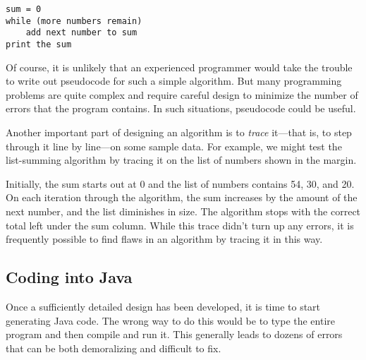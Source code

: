 \begin{jjjlisting}
\begin{lstlisting}
sum = 0
while (more numbers remain)
    add next number to sum
print the sum
\end{lstlisting}
\end{jjjlisting}

Of course, it is unlikely that an experienced programmer would take
the trouble to write out pseudocode for such a simple algorithm.  But
many programming problems are quite complex and require careful design
to minimize the number of errors that the program contains.  In such
situations, pseudocode could be useful.

Another important part of designing an algorithm is to {\it trace}
it---that is, to step through it line by line---on some sample data.
For example, we might test the list-summing algorithm by tracing it on
the list of numbers shown in the margin.


Initially, the sum starts out at 0 and the
list of numbers contains 54, 30, and 20. On each iteration through the
algorithm, the sum increases by the amount of the next number, and the
list diminishes in size.  The algorithm stops with the correct total
left under the sum column.  While this trace didn't turn up any errors,
it is frequently possible to find flaws in an algorithm by tracing it
in this way.

\subsection{Coding into Java}

\noindent Once a sufficiently detailed design has been developed, it 
is time to start generating Java code.  The wrong way to do this would
be to type the entire program and then compile and run it.  This
generally leads to dozens of errors that can be both demoralizing and
difficult to fix.

